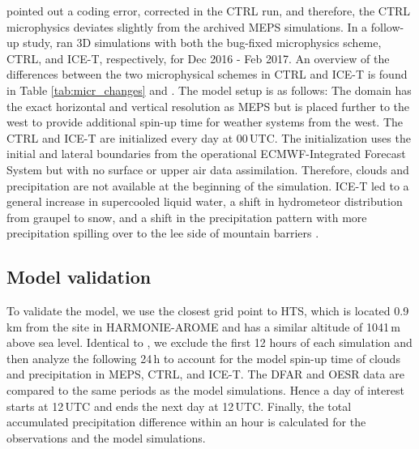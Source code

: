 \documentclass{ametsocV5}
\begin{document}
	 	\citet{engdahl_effects_2020} pointed out a coding error, corrected in the CTRL run, and therefore, the CTRL microphysics deviates slightly from the archived MEPS simulations. In a follow-up study, \citet{engdahl_effects_2020} ran 3D simulations with both the bug-fixed microphysics scheme, CTRL, and ICE-T, respectively, for Dec 2016 - Feb 2017. An overview of the differences between the two microphysical schemes in CTRL and ICE-T is found in Table \ref{tab:micr_changes} and \citet{engdahl_improving_2020}. The \citet{engdahl_effects_2020} model setup is as follows: The domain has the exact horizontal and vertical resolution as MEPS but is placed further to the west to provide additional spin-up time for weather systems from the west. The CTRL and ICE-T are initialized every day at 00\,UTC. The initialization uses the initial and lateral boundaries from the operational ECMWF-Integrated Forecast System but with no surface or upper air data assimilation. Therefore, clouds and precipitation are not available at the beginning of the simulation. ICE-T led to a general increase in supercooled liquid water, a shift in hydrometeor distribution from graupel to snow, and a shift in the precipitation pattern with more precipitation spilling over to the lee side of mountain barriers \citep{engdahl_effects_2020}.
		
		
		
	\subsection{Model validation}\label{sec:methodology:MEPS_vali}
		To validate the model, we use the closest grid point to HTS, which is located 0.9\,km from the site in HARMONIE-AROME and has a similar altitude of 1041\,m above sea level. Identical to \citet{engdahl_effects_2020}, we exclude the first 12 hours of each simulation and then analyze the following 24\,h to account for the model spin-up time of clouds and precipitation in MEPS, CTRL, and ICE-T. The DFAR and OESR data are compared to the same periods as the model simulations. Hence a day of interest starts at 12\,UTC and ends the next day at 12\,UTC. Finally, the total accumulated precipitation difference within an hour is calculated for the observations and the model simulations. 
		
\end{document}

